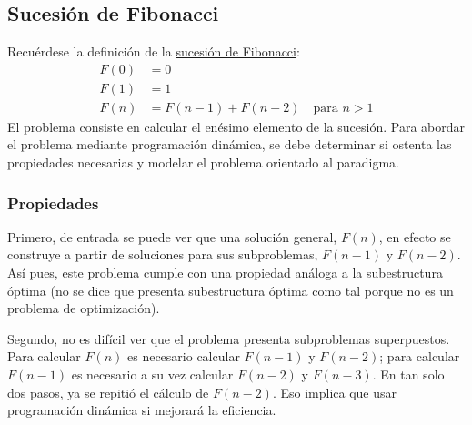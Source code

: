 \subsection{Sucesión de Fibonacci}

Recuérdese la definición de la \hyperref[sec:fibonacci_recursiva]{sucesión de Fibonacci}: 
\begin{align*}
    F(0) &= 0 \\
    F(1) &= 1 \\
    F(n) &= F(n-1) + F(n-2) \quad \text{para } n > 1
\end{align*}
El problema consiste en calcular el enésimo elemento de la sucesión. Para abordar el problema mediante programación dinámica, se debe determinar si ostenta las propiedades necesarias y modelar el problema orientado al paradigma.

\subsubsection{Propiedades}

Primero, de entrada se puede ver que una solución general, $F(n)$, en efecto se construye a partir de soluciones para sus subproblemas, $F(n-1)$ y $F(n-2)$. Así pues, este problema cumple con una propiedad análoga a la subestructura óptima (no se dice que presenta subestructura óptima como tal porque no es un problema de optimización).

Segundo, no es difícil ver que el problema presenta subproblemas superpuestos. Para calcular $F(n)$ es necesario calcular $F(n-1)$ y $F(n-2)$; para calcular $F(n-1)$ es necesario a su vez calcular $F(n-2)$ y $F(n-3)$. En tan solo dos pasos, ya se repitió el cálculo de $F(n-2)$. Eso implica que usar programación dinámica si mejorará la eficiencia.

